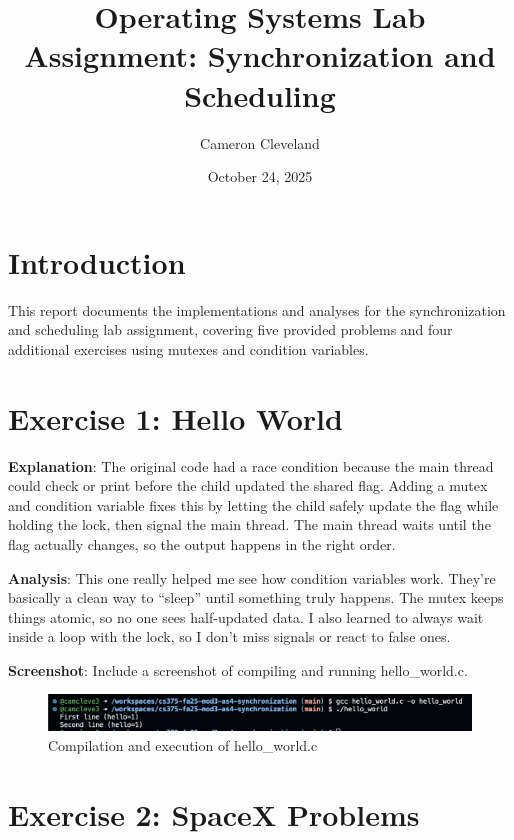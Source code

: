 \documentclass{article}
\begin{document}
\title{Operating Systems Lab Assignment: Synchronization and Scheduling}
\author{Cameron Cleveland}
\date{October 24, 2025}
\maketitle

\section{Introduction}
This report documents the implementations and analyses for the synchronization and scheduling lab assignment, covering five provided problems and four additional exercises using mutexes and condition variables.

\section{Exercise 1: Hello World}


\textbf{Explanation}:  
The original code had a race condition because the main thread could check or print before the child updated the shared flag. Adding a mutex and condition variable fixes this by letting the child safely update the flag while holding the lock, then signal the main thread. The main thread waits until the flag actually changes, so the output happens in the right order.

\textbf{Analysis}:  
This one really helped me see how condition variables work. They’re basically a clean way to “sleep” until something truly happens. The mutex keeps things atomic, so no one sees half-updated data. I also learned to always wait inside a loop with the lock, so I don’t miss signals or react to false ones.

\textbf{Screenshot}: Include a screenshot of compiling and running hello\_world.c.
\begin{figure}[h]
  \centering
  \includegraphics[width=\textwidth]{pic1.png}
  \caption{Compilation and execution of hello\_world.c}
\end{figure}

\section{Exercise 2: SpaceX Problems}

\end{document}
